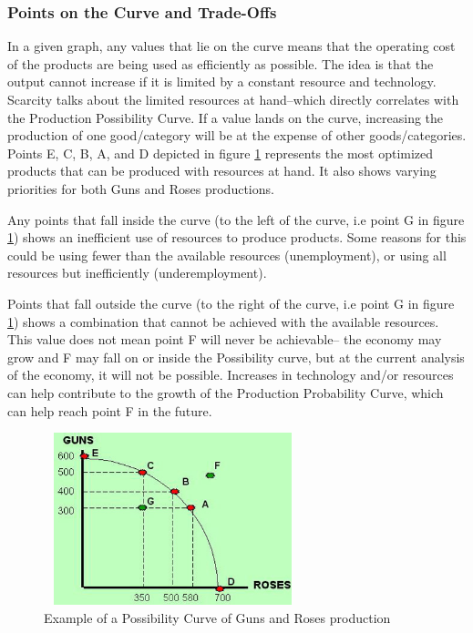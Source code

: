 \documentclass[a4paper, 12pt] {article}
\begin{document}
\subsubsection{Points on the Curve and Trade-Offs}
In a given graph, any values that lie on the curve means that the operating cost
of the products are being used as efficiently as possible. The idea is that the
output cannot increase if it is limited by a constant resource and technology.
Scarcity talks about the limited resources at hand--which directly correlates
with the Production Possibility Curve. If a value lands on the curve, increasing
the production of one good/category will be at the expense of other goods/categories.
Points E, C, B, A, and D depicted in figure \ref{fig:GnR1} represents the most
optimized products that can be produced with resources at hand. It also shows
varying priorities for both Guns and Roses productions.

Any points that fall inside the curve (to the left of the curve, i.e point G in
figure \ref{fig:GnR1}) shows an inefficient use of resources to produce products.
Some reasons for this could be using fewer than the available resources
(unemployment), or using all resources but inefficiently (underemployment).

Points that fall outside the curve (to the right of the curve, i.e point G in
figure \ref{fig:GnR1}) shows a combination that cannot be achieved with the
available resources. This value does not mean point F will never be achievable--
the economy may grow and F may fall on or inside the Possibility curve, but at
the current analysis of the economy, it will not be possible.
Increases in technology and/or resources can help contribute to the growth of
the Production Probability Curve, which can help reach point F in the future.

\begin{figure}
    \centering
    \includegraphics[width=7.5cm, height=5cm]{Production_Possibility_Curve.jpg}
    \caption{Example of a Possibility Curve of Guns and Roses production}
    \label{fig:GnR1}
\end{figure}
\end{document}

